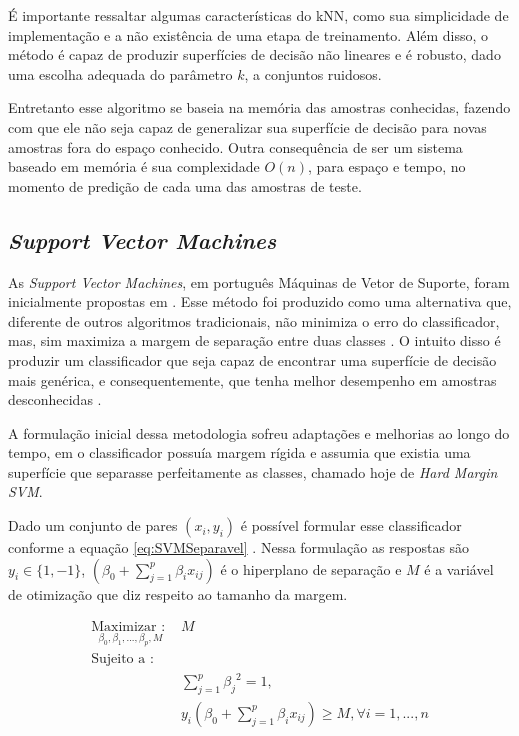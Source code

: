  

É importante ressaltar algumas características do kNN, como sua simplicidade de implementação e a não existência de uma etapa de treinamento. Além disso, o método é capaz de produzir superfícies de decisão não lineares e é robusto, dado uma escolha adequada do parâmetro $k$, a conjuntos ruidosos.

Entretanto esse algoritmo se baseia na memória das amostras conhecidas, fazendo com que ele não seja capaz de generalizar sua superfície de decisão para novas amostras fora do espaço conhecido. Outra consequência de ser um sistema baseado em memória é sua complexidade $O(n)$, para espaço e tempo, no momento de predição de cada uma das amostras de teste. 


\subsection{\textit{Support Vector Machines}}
As \textit{Support Vector Machines}, em português Máquinas de Vetor de Suporte, foram inicialmente propostas em . Esse método foi produzido como uma alternativa que, diferente de outros algoritmos tradicionais, não minimiza o erro do classificador, mas, sim maximiza a margem de separação entre duas classes \cite{James20131}. O intuito disso é produzir um classificador que seja capaz de encontrar uma superfície de decisão mais genérica, e consequentemente, que tenha melhor desempenho em amostras desconhecidas \cite{Cortes1995}.

A formulação inicial dessa metodologia sofreu adaptações e melhorias ao longo do tempo, em  o classificador possuía margem rígida e assumia que existia uma superfície que separasse perfeitamente as classes, chamado hoje de \textit{Hard Margin SVM}.

Dado um conjunto de pares $(x_i, y_i)$ é possível formular esse classificador conforme a equação \ref{eq:SVMSeparavel} \cite{James20131}. Nessa formulação as respostas são $y_i \in \{1, -1\}$, $(\beta_0 + \sum_{j=1}^{p}{{\beta_i x_{ij}}})$ é o hiperplano de separação e $M$ é a variável de otimização que diz respeito ao tamanho da margem. 

\begin{equation}
\begin{split}
\underset {\beta_0, \beta_1, ..., \beta_p, M}  {\text{Maximizar : }} &{M} \\
\text{Sujeito a : } \\
&\sum_{j=1}^{p}{{\beta_j}^2} = 1, \\
&y_i(\beta_0 + \sum_{j=1}^{p}{{\beta_i x_{ij}}}) \geq M, \forall i = 1, ..., n
\end{split}
\label{eq:SVMSeparavel}
\end{equation}

